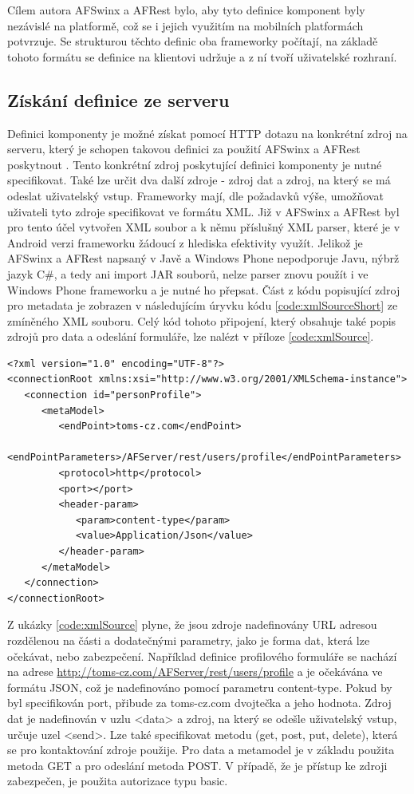 Cílem autora AFSwinx a AFRest \cite{tomasek-thesis} bylo, aby tyto definice komponent byly nezávislé na platformě, což se i jejich využitím na mobilních platformách potvrzuje. Se strukturou těchto definic oba frameworky počítají, na základě tohoto formátu se definice na klientovi udržuje a z ní tvoří uživatelské rozhraní. 

\subsection{Získání definice ze serveru}
Definici komponenty je možné získat pomocí HTTP dotazu na konkrétní zdroj na serveru, který je schopen takovou definici za použití AFSwinx a AFRest poskytnout \cite{tomasek-thesis}. Tento konkrétní zdroj poskytující definici komponenty je nutné specifikovat. Také lze určit dva další zdroje - zdroj dat a zdroj, na který se má odeslat uživatelský vstup. Frameworky mají, dle požadavků výše, umožňovat uživateli tyto zdroje specifikovat ve formátu XML. Již v AFSwinx a AFRest byl pro tento účel vytvořen XML soubor a k němu příslušný XML parser, které je v Android verzi frameworku žádoucí z hlediska efektivity využít. Jelikož je AFSwinx a AFRest napsaný v Javě a Windows Phone nepodporuje Javu, nýbrž jazyk C\#, a tedy ani import JAR souborů, nelze parser znovu použít i ve Windows Phone frameworku a je nutné ho přepsat. Část z kódu popisující zdroj pro metadata je zobrazen v následujícím úryvku kódu \ref{code:xmlSourceShort} ze zmíněného XML souboru. Celý kód tohoto připojení, který obsahuje také popis zdrojů pro data a odeslání formuláře, lze nalézt v příloze \ref{code:xmlSource}. 

\begin{lstlisting}[caption=Ukázka XML specifikace zdroje pro metadata,
label={code:xmlSourceShort}, basicstyle=\footnotesize]
<?xml version="1.0" encoding="UTF-8"?>
<connectionRoot xmlns:xsi="http://www.w3.org/2001/XMLSchema-instance">
   <connection id="personProfile">
      <metaModel>
         <endPoint>toms-cz.com</endPoint>
         <endPointParameters>/AFServer/rest/users/profile</endPointParameters>
         <protocol>http</protocol>
         <port></port>
         <header-param>
            <param>content-type</param>
            <value>Application/Json</value>
         </header-param>
      </metaModel>
   </connection>
</connectionRoot>
\end{lstlisting}

Z ukázky \ref{code:xmlSource} plyne, že jsou zdroje nadefinovány URL adresou rozdělenou na části a dodatečnými parametry, jako je forma dat, která lze očekávat, nebo zabezpečení. Například definice profilového formuláře se nachází na adrese \url{http://toms-cz.com/AFServer/rest/users/profile} a je očekávána ve formátu JSON, což je nadefinováno pomocí parametru content-type. Pokud by byl specifikován port, přibude za toms-cz.com dvojtečka a jeho hodnota. Zdroj dat je nadefinován v uzlu <data> a zdroj, na který se odešle uživatelský vstup, určuje uzel <send>. Lze také specifikovat metodu (get, post, put, delete), která se pro kontaktování zdroje použije. Pro data a metamodel je v základu použita metoda GET a pro odeslání metoda POST. V případě, že je přístup ke zdroji zabezpečen, je použita autorizace typu basic.

